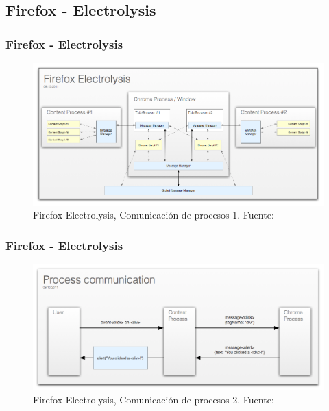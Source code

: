 \documentclass[serif,9pt]{beamer}
\begin{document}
\subsection{Firefox - Electrolysis}
\begin{frame}
	\frametitle{Firefox - Electrolysis}
	\begin{figure}[h]
        \centering
        \includegraphics[scale=0.3]{figures/electrolysis.png}
        \caption{Firefox Electrolysis, Comunicaci\'on de procesos 1. Fuente: \cite{Firefox101}}
        \label{fig:ChromePComm1}
    \end{figure}
\end{frame}

\begin{frame}
	\frametitle{Firefox - Electrolysis}
	\begin{figure}[h]
        \centering
        \includegraphics[width=1\textwidth]{figures/e10s-processes.png}
        \caption{Firefox Electrolysis, Comunicaci\'on de procesos 2. Fuente: \cite{Firefox101}}
        \label{fig:ChromePComm2}
    \end{figure}
\end{frame}
\end{document}
